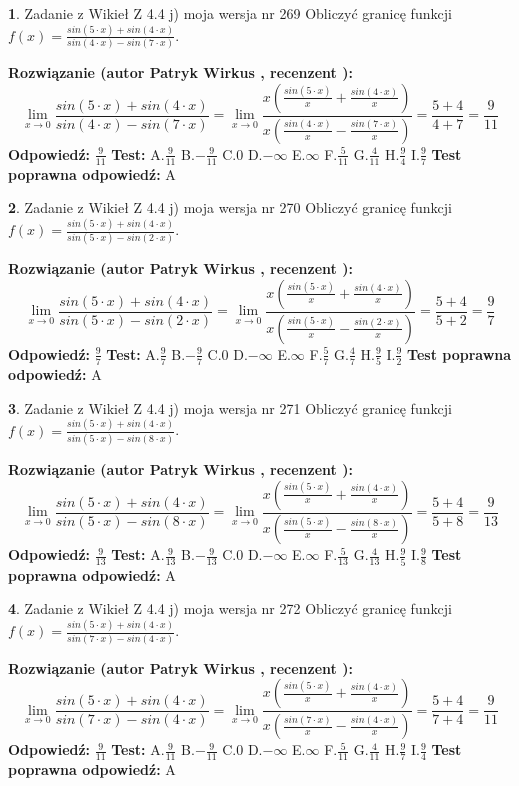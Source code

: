 \documentclass[12pt, a4paper]{article}
\theoremstyle{definition} %
\newtheorem{zad}{}
\newcommand{\zadStart}[1]{\begin{zad}#1\newline}
\newcommand{\zadStop}{\end{zad}}
\newcommand{\rozwStart}[2]{\noindent \textbf{Rozwiązanie (autor #1 , recenzent #2): }\newline}
\newcommand{\rozwStop}{\newline}
\newcommand{\odpStart}{\noindent \textbf{Odpowiedź:}\newline}
\newcommand{\odpStop}{\newline}
\newcommand{\testStart}{\noindent \textbf{Test:}\newline}
\newcommand{\testStop}{\newline}
\newcommand{\kluczStart}{\noindent \textbf{Test poprawna odpowiedź:}\newline}
\newcommand{\kluczStop}{\newline}
\begin{document}
\zadStart{Zadanie z Wikieł Z 4.4 j) moja wersja nr 269}
Obliczyć granicę funkcji $f(x)=\frac{sin(5\cdot x) +sin(4\cdot x)}{sin(4\cdot x) -sin(7\cdot x)}$.
\zadStop
\rozwStart{Patryk Wirkus}{}
$$\lim\limits_{x\to 0}\frac{sin(5\cdot x) +sin(4\cdot x)}{sin(4\cdot x) -sin(7\cdot x)}=\lim\limits_{x\to 0}\frac{x(\frac{sin(5\cdot x)}{x}+\frac{sin(4\cdot x)}{x})}{x(\frac{sin(4\cdot x)}{x}-\frac{sin(7\cdot x)}{x})}=\frac{5+4}{4+7} = \frac{9}{11}$$
\rozwStop
\odpStart
$\frac{9}{11}$
\odpStop
\testStart
A.$\frac{9}{11}$
B.$-\frac{9}{11}$
C.$0$
D.$-\infty$
E.$\infty$
F.$\frac{5}{11}$
G.$\frac{4}{11}$
H.$\frac{9}{4}$
I.$\frac{9}{7}$
\testStop
\kluczStart
A
\kluczStop



\zadStart{Zadanie z Wikieł Z 4.4 j) moja wersja nr 270}
Obliczyć granicę funkcji $f(x)=\frac{sin(5\cdot x) +sin(4\cdot x)}{sin(5\cdot x) -sin(2\cdot x)}$.
\zadStop
\rozwStart{Patryk Wirkus}{}
$$\lim\limits_{x\to 0}\frac{sin(5\cdot x) +sin(4\cdot x)}{sin(5\cdot x) -sin(2\cdot x)}=\lim\limits_{x\to 0}\frac{x(\frac{sin(5\cdot x)}{x}+\frac{sin(4\cdot x)}{x})}{x(\frac{sin(5\cdot x)}{x}-\frac{sin(2\cdot x)}{x})}=\frac{5+4}{5+2} = \frac{9}{7}$$
\rozwStop
\odpStart
$\frac{9}{7}$
\odpStop
\testStart
A.$\frac{9}{7}$
B.$-\frac{9}{7}$
C.$0$
D.$-\infty$
E.$\infty$
F.$\frac{5}{7}$
G.$\frac{4}{7}$
H.$\frac{9}{5}$
I.$\frac{9}{2}$
\testStop
\kluczStart
A
\kluczStop



\zadStart{Zadanie z Wikieł Z 4.4 j) moja wersja nr 271}
Obliczyć granicę funkcji $f(x)=\frac{sin(5\cdot x) +sin(4\cdot x)}{sin(5\cdot x) -sin(8\cdot x)}$.
\zadStop
\rozwStart{Patryk Wirkus}{}
$$\lim\limits_{x\to 0}\frac{sin(5\cdot x) +sin(4\cdot x)}{sin(5\cdot x) -sin(8\cdot x)}=\lim\limits_{x\to 0}\frac{x(\frac{sin(5\cdot x)}{x}+\frac{sin(4\cdot x)}{x})}{x(\frac{sin(5\cdot x)}{x}-\frac{sin(8\cdot x)}{x})}=\frac{5+4}{5+8} = \frac{9}{13}$$
\rozwStop
\odpStart
$\frac{9}{13}$
\odpStop
\testStart
A.$\frac{9}{13}$
B.$-\frac{9}{13}$
C.$0$
D.$-\infty$
E.$\infty$
F.$\frac{5}{13}$
G.$\frac{4}{13}$
H.$\frac{9}{5}$
I.$\frac{9}{8}$
\testStop
\kluczStart
A
\kluczStop



\zadStart{Zadanie z Wikieł Z 4.4 j) moja wersja nr 272}
Obliczyć granicę funkcji $f(x)=\frac{sin(5\cdot x) +sin(4\cdot x)}{sin(7\cdot x) -sin(4\cdot x)}$.
\zadStop
\rozwStart{Patryk Wirkus}{}
$$\lim\limits_{x\to 0}\frac{sin(5\cdot x) +sin(4\cdot x)}{sin(7\cdot x) -sin(4\cdot x)}=\lim\limits_{x\to 0}\frac{x(\frac{sin(5\cdot x)}{x}+\frac{sin(4\cdot x)}{x})}{x(\frac{sin(7\cdot x)}{x}-\frac{sin(4\cdot x)}{x})}=\frac{5+4}{7+4} = \frac{9}{11}$$
\rozwStop
\odpStart
$\frac{9}{11}$
\odpStop
\testStart
A.$\frac{9}{11}$
B.$-\frac{9}{11}$
C.$0$
D.$-\infty$
E.$\infty$
F.$\frac{5}{11}$
G.$\frac{4}{11}$
H.$\frac{9}{7}$
I.$\frac{9}{4}$
\testStop
\kluczStart
A
\kluczStop
\end{document}
